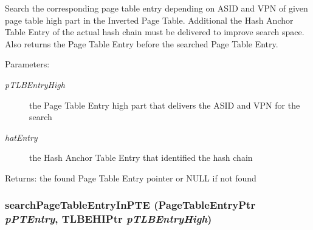 Search the corresponding page table entry depending on ASID and VPN of given page table high part in the Inverted Page Table. Additional the Hash Anchor Table Entry of the actual hash chain must be delivered to improve search space. Also returns the Page Table Entry before the searched Page Table Entry. \begin{Desc}
\item[Parameters:]
\begin{description}
\item[{\em pTLBEntryHigh}]the Page Table Entry high part that delivers the ASID and VPN for the search \item[{\em hatEntry}]the Hash Anchor Table Entry that identified the hash chain \end{description}
\end{Desc}
\begin{Desc}
\item[Returns:]the found Page Table Entry pointer or NULL if not found \end{Desc}
\hypertarget{group___v_m_m___i_p_t_g87ad4a7444ff78fa4502299524d8a5b9}{
\subsubsection[{searchPageTableEntryInPTE}]{ searchPageTableEntryInPTE ({\bf PageTableEntryPtr} {\em pPTEntry}, \/  {\bf TLBEHIPtr} {\em pTLBEntryHigh})}}
\label{group___v_m_m___i_p_t_g87ad4a7444ff78fa4502299524d8a5b9}


